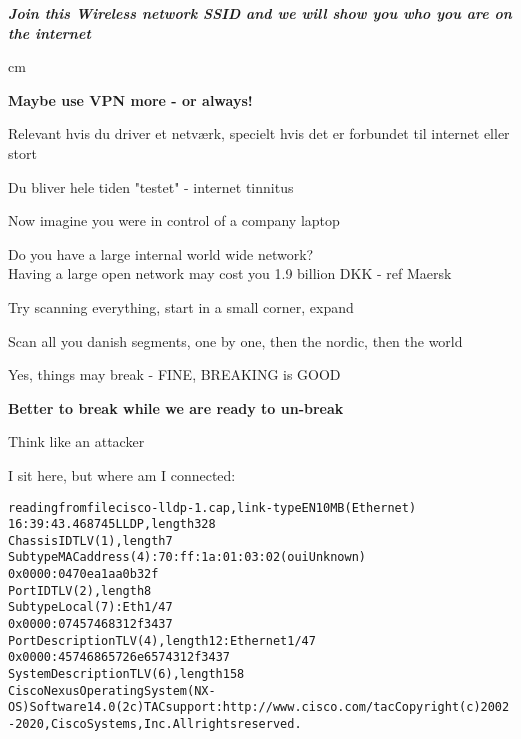 \documentclass[Screen16to9,17pt]{foils}
\begin{document}
\emph{\bf Join this Wireless network SSID and we will show you who you are on the internet}

 cm
\centerline{\bf\Large Maybe use VPN more - or always!}





\begin{list2}
\item Relevant hvis du driver et netværk, specielt hvis det er forbundet til internet eller stort
\item Du bliver hele tiden "testet" - internet tinnitus
\end{list2}




\begin{list2}
\item Now imagine you were in control of a company laptop
\item Do you have a large internal world wide network?\\
Having a large open network may cost you 1.9 billion DKK - ref Maersk
\item Try scanning everything, start in a small corner, expand
\item Scan all you danish segments, one by one, then the nordic, then the world
\item Yes, things may break - FINE, BREAKING is GOOD
\end{list2}

\centerline{\bf Better to break while we are ready to un-break}


Think like an attacker

I sit here, but where am I connected:
\begin{alltt}\footnotesize
reading from file cisco-lldp-1.cap, link-type EN10MB (Ethernet)
16:39:43.468745 LLDP, length 328
        Chassis ID TLV (1), length 7
          Subtype MAC address (4): 70:ff:1a:01:03:02 (oui Unknown)
          0x0000:  0470 ea1a a0b3 2f
        Port ID TLV (2), length 8
          Subtype Local (7): Eth1/47
          0x0000:  0745 7468 312f 3437
        Port Description TLV (4), length 12: Ethernet1/47
          0x0000:  4574 6865 726e 6574 312f 3437
        System Description TLV (6), length 158
          Cisco Nexus Operating System (NX-OS) Software 14.0(2c) TAC support: http://www.cisco.com/tac Copyright (c) 2002-2020, Cisco Systems, Inc. All rights reserved.
\end{alltt}
\end{document}
